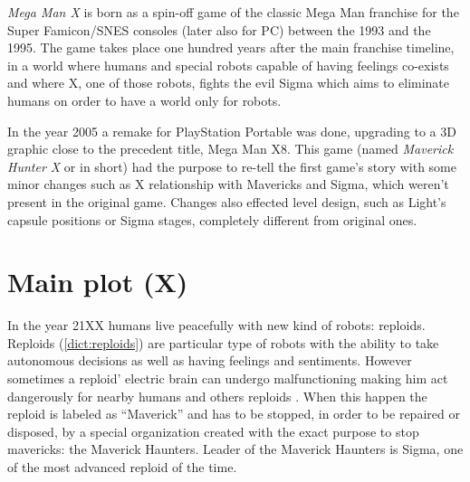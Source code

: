 
\textit{Mega Man X} is born as a spin-off game of the classic Mega Man franchise for the Super Famicon/SNES consoles (later also for PC)  between the 1993 and the 1995\cite{wiki:MMX}. The game takes place one hundred years after the main franchise timeline, in a world where humans and special robots capable of having feelings co-exists and where X, one of those robots, fights the evil Sigma which aims to eliminate humans on order to have a world only for robots.

In the year 2005 a remake for PlayStation Portable was done, upgrading to a 3D graphic close to the precedent title, Mega Man X8. This game (named \textit{Maverick Hunter X }or \mhx in short) had the purpose to re-tell the first game's story with some minor changes such as X relationship with Mavericks and Sigma, which weren't present in the original game. Changes also effected level design, such as Light's capsule positions or Sigma stages, completely different from original ones.

\section[Main plot]{Main plot (X)}
In the year 21XX humans live peacefully with new kind of robots: reploids. Reploids (\ref{dict:reploids}) are particular type of robots with the ability to take autonomous decisions as well as having feelings and sentiments\cite{Xcoll1:Manual_X1}. However sometimes  a reploid' electric brain can undergo  malfunctioning making him act dangerously for nearby humans and others reploids . When this happen the reploid is labeled as ``Maverick'' and has to be stopped, in order to be repaired or disposed, by a special organization created with the exact purpose to stop mavericks: the Maverick Haunters. Leader of the Maverick Haunters is Sigma, one of the most advanced reploid of the time. 


